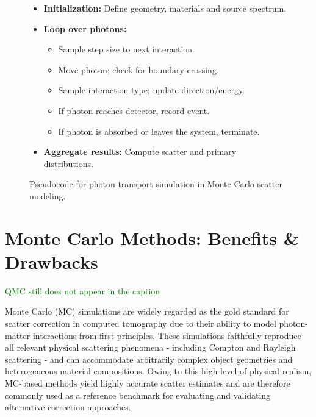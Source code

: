 \begin{figure}[H]
\centering
\begin{tcolorbox}[colback=white!95!gray, colframe=black!60, width=0.9 \textwidth, title=Monte Carlo Photon Transport Algorithm, fonttitle=\bfseries]
\begin{itemize}[leftmargin=1.5em]
    \item \textbf{Initialization:} Define geometry, materials and source
    spectrum.
    \item \textbf{Loop over photons:}
    \begin{itemize}
        \item Sample step size to next interaction.
        \item Move photon; check for boundary crossing.
        \item Sample interaction type; update direction/energy.
        \item If photon reaches detector, record event.
        \item If photon is absorbed or leaves the system, terminate.
    \end{itemize}
    \item \textbf{Aggregate results:} Compute scatter and primary distributions.
\end{itemize}
\end{tcolorbox}
\caption{Pseudocode for photon transport simulation in Monte Carlo scatter modeling.}
\label{fig:photon-transport-pseudocode}
\end{figure}


\section{Monte Carlo Methods: Benefits \& Drawbacks}
\textcolor{green}{QMC still does not appear in the caption}

Monte Carlo (MC) simulations are widely regarded as the gold standard for
scatter correction in computed tomography due to their ability to model
photon-matter interactions from first principles. These simulations faithfully
reproduce all relevant physical scattering phenomena - including Compton and
Rayleigh scattering - and can accommodate arbitrarily complex object geometries
and heterogeneous material compositions. Owing to this high level of physical
realism, MC-based methods yield highly accurate scatter estimates and are
therefore commonly used as a reference benchmark for evaluating and validating
alternative correction approaches.

